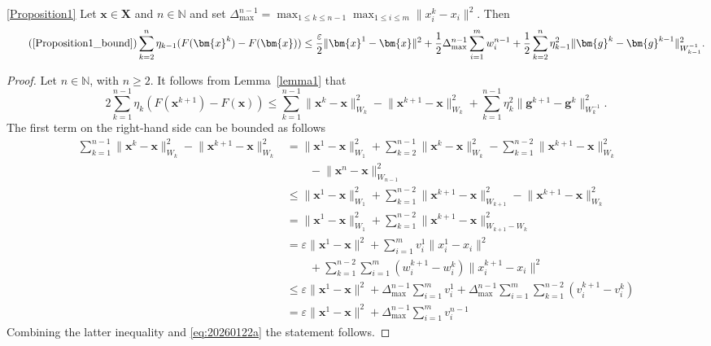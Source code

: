 \documentclass[11pt]{article}
\theoremstyle{plain}
\theoremstyle{definition}
\theoremstyle{remark}
\newcommand{\norm}[1]{\lVert{#1}\rVert}
\newcommand{\bHH}{\bm{X}}
\newcommand{\x}{x}
\newcommand{\bx}{\bm{x}}
\newcommand{\buu}{\bm{g}}
\newcommand{\w}{w}
\newcommand{\iter}{n}
\newcommand{\ite}{k}
\newcommand{\N}{\mathbb{N}}
\newcommand{\W}{W}
\begin{document}
\begin{customcor}{\ref{Proposition1}}
Let $\bx\in \bHH$ and $\iter \in \N$ and set
$\Delta^{\iter-1}_{\max} = \max_{1\leq \ite\leq \iter-1} \max_{1\leq i\leq m} \norm{\x^\ite_i - x_i}^2$. Then
\begin{equation}%
\tag{\ref{Proposition1_bound}}
\sum_{\ite=2}^\iter\eta_{\ite-1}(F(\bx^\ite) - F(\bx)) \le \frac{\varepsilon}{2}\lVert \bx^1 - \bx\rVert^2 + \frac{1}{2}\Delta_{\max}^{\iter-1} \sum_{i=1}^m \w_i^{\iter-1} + \frac{1}{2}\sum_{\ite=2}^\iter\eta_{\ite-1}^2 \lVert \buu^{\ite} - \buu^{\ite-1} \rVert_{\W_{\ite-1}^{-1}}^2. 
\end{equation}
\end{customcor}
\begin{proof}
Let $n\in \N$, with $n\geq 2$. It follows from Lemma~\ref{lemma1} that
\begin{equation}
\label{eq:20260122a}
    2\sum_{\ite=1}^{\iter-1} \eta_\ite (F(\bx^{\ite+1})- F(\bx))
    \leq \sum_{\ite=1}^{\iter-1} \norm{\bx^\ite-\bx}_{\W_\ite}^2 - \norm{\bx^{\ite+1}-\bx}_{\W_\ite}^2 + \sum_{\ite=1}^{\iter-1} \eta_\ite^2\norm{\buu^{\ite+1}-\buu^\ite}_{\W_\ite^{-1}}^2.
\end{equation}
The first term on the right-hand side can be bounded as follows
\begin{align*}
    \sum_{\ite=1}^{\iter-1} \norm{\bx^\ite-\bx}_{\W_\ite}^2 - \norm{\bx^{\ite+1}-\bx}_{\W_\ite}^2 
    &= \norm{\bx^1-\bx}_{\W_1}^2 + \sum_{\ite=2}^{\iter-1} \norm{\bx^\ite-\bx}_{\W_\ite}^2 - \sum_{\ite=1}^{\iter-2} \norm{\bx^{\ite+1}-\bx}_{\W_\ite}^2\\
    &\qquad-\norm{\bx^{\iter}-\bx}_{\W_{\iter-1}}^2\\
    &\leq \norm{\bx^1-\bx}_{\W_1}^2 + \sum_{\ite=1}^{\iter-2} \norm{\bx^{\ite+1}-\bx}_{\W_{\ite+1}}^2 - \norm{\bx^{\ite+1}-\bx}_{\W_\ite}^2\\
    &= \norm{\bx^1-\bx}_{\W_1}^2 + \sum_{\ite=1}^{\iter-2} \norm{\bx^{\ite+1}-\bx}_{\W_{\ite+1}-\W_\ite}^2\\
    &= \varepsilon \norm{\bx^1-\bx}^2+ \sum_{i=1}^m v_i^1\norm{\x_i^1 -\x_i}^2 \\
    &\qquad + \sum_{\ite=1}^{\iter-2}\sum_{i=1}^m(\w_i^{\ite+1}-\w_i^\ite)\norm{\x_i^{\ite+1}-\x_i}^2\\
    &\leq \varepsilon \norm{\bx^1-\bx}^2+ \Delta_{\max}^{\iter-1}\sum_{i=1}^m v_i^1 + \Delta_{\max}^{\iter-1}\sum_{i=1}^m\sum_{\ite=1}^{\iter-2}(v_i^{\ite+1}-v_i^\ite)\\
    &= \varepsilon \norm{\bx^1-\bx}^2+ \Delta_{\max}^{\iter-1}\sum_{i=1}^m v_i^{\iter-1}
\end{align*}
Combining the latter inequality and \eqref{eq:20260122a} the statement follows.
\end{proof}
\end{document}

